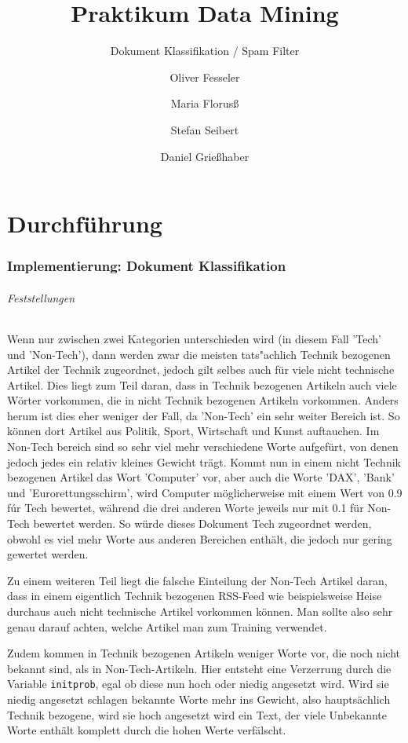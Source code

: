 \documentclass[12pt,a4paper]{scrartcl}
\begin{document}
\title{Praktikum Data Mining}
\subtitle{Dokument Klassifikation / Spam Filter}
\author{Oliver Fesseler \and Maria Florus\ss \and Stefan Seibert \and  Daniel Grie\ss haber}
\maketitle
\newpage

\part*{ Durchf\"uhrung}

\section*{Implementierung: Dokument Klassifikation}

\paragraph*{Feststellungen}
Wenn nur zwischen zwei Kategorien unterschieden wird (in diesem Fall 'Tech' und 'Non-Tech'), dann werden zwar die meisten tats"achlich Technik bezogenen Artikel der Technik zugeordnet, jedoch gilt selbes auch f\"ur viele nicht technische Artikel. Dies liegt zum Teil daran, dass in Technik bezogenen Artikeln auch viele W\"orter vorkommen, die in nicht Technik bezogenen Artikeln vorkommen. Anders herum ist dies eher weniger der Fall, da 'Non-Tech' ein sehr weiter Bereich ist. So k\"onnen dort Artikel aus Politik, Sport, Wirtschaft und Kunst auftauchen. Im Non-Tech bereich sind so sehr viel mehr verschiedene Worte aufgef\"urt, von denen jedoch jedes ein relativ kleines Gewicht tr\"agt. Kommt nun in einem nicht Technik bezogenen Artikel das Wort 'Computer' vor, aber auch die Worte 'DAX', 'Bank' und 'Eurorettungsschirm', wird Computer m\"oglicherweise mit einem Wert von 0.9 f\'ur Tech bewertet, w\"ahrend die drei anderen Worte jeweils nur mit 0.1 f\"ur Non-Tech bewertet werden. So w\"urde dieses Dokument Tech zugeordnet werden, obwohl es viel mehr Worte aus anderen Bereichen enth\"alt, die jedoch nur gering gewertet werden.

Zu einem weiteren Teil liegt die falsche Einteilung der Non-Tech Artikel daran, dass in einem eigentlich Technik bezogenen RSS-Feed wie beispielsweise Heise durchaus auch nicht technische Artikel vorkommen k\"onnen. Man sollte also sehr genau darauf achten, welche Artikel man zum Training verwendet. 

Zudem kommen in Technik bezogenen Artikeln weniger Worte vor, die noch nicht bekannt sind, als in Non-Tech-Artikeln. Hier entsteht eine Verzerrung durch die Variable \lstinline|initprob|, egal ob diese nun hoch oder niedig angesetzt wird. Wird sie niedig angesetzt schlagen bekannte Worte mehr ins Gewicht, also haupts\"achlich Technik bezogene, wird sie hoch angesetzt wird ein Text, der viele Unbekannte Worte enth\"alt komplett durch die hohen Werte verf\"alscht. 
\end{document}
